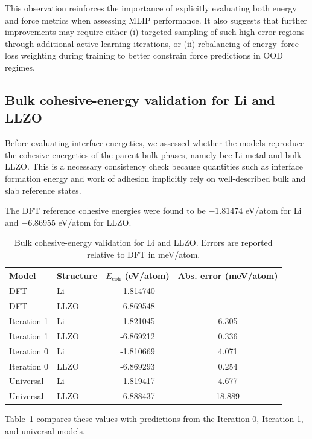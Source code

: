 \documentclass[12pt,a4paper,oneside]{book}
\begin{document}
This observation reinforces the importance of explicitly evaluating both energy and force metrics when assessing MLIP performance. It also suggests that further improvements may require either (i) targeted sampling of such high-error regions through additional active learning iterations, or (ii) rebalancing of energy--force loss weighting during training to better constrain force predictions in OOD regimes.

\subsection{Bulk cohesive-energy validation for Li and LLZO}

Before evaluating interface energetics, we assessed whether the models reproduce the cohesive energetics of the parent bulk phases, namely bcc Li metal and bulk LLZO. This is a necessary consistency check because quantities such as interface formation energy and work of adhesion implicitly rely on well-described bulk and slab reference states.

The DFT reference cohesive energies were found to be \(-1.81474\) eV/atom for Li and \(-6.86955\) eV/atom for LLZO. 

\begin{table}[h!]
\centering
\caption{Bulk cohesive-energy validation for Li and LLZO. Errors are reported relative to DFT in meV/atom.}
\label{tab:cohesive_validation}
\begin{tabular}{l l c c}
\hline
Model & Structure & \(E_{\mathrm{coh}}\) (eV/atom) & Abs. error (meV/atom) \\
\hline
DFT & Li   & -1.814740 & -- \\
DFT & LLZO & -6.869548 & -- \\
\hline
Iteration 1 & Li   & -1.821045 & 6.305 \\
Iteration 1 & LLZO & -6.869212 & 0.336 \\
Iteration 0 & Li   & -1.810669 & 4.071 \\
Iteration 0 & LLZO & -6.869293 & 0.254 \\
Universal   & Li   & -1.819417 & 4.677 \\
Universal   & LLZO & -6.888437 & 18.889 \\
\hline
\end{tabular}
\end{table}

Table~\ref{tab:cohesive_validation} compares these values with predictions from the Iteration 0, Iteration 1, and universal models.
\end{document}
